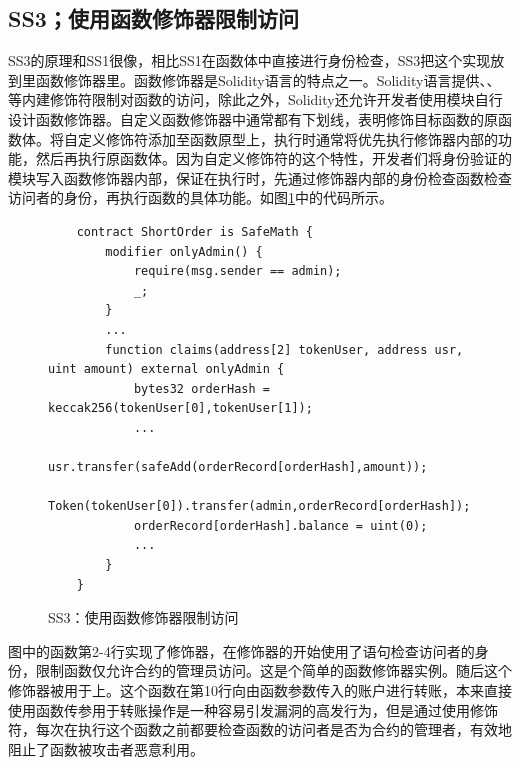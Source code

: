 \subsection{SS3；使用函数修饰器限制访问}
SS3的原理和SS1很像，相比SS1在函数体中直接进行身份检查，SS3把这个实现放到里函数修饰器里。函数修饰器是Solidity语言的特点之一。Solidity语言提供、、等内建修饰符限制对函数的访问，除此之外，Solidity还允许开发者使用模块自行设计函数修饰器。自定义函数修饰器中通常都有下划线\codeff{\_;}，表明修饰目标函数的原函数体。将自定义修饰符添加至函数原型上，执行时通常将优先执行修饰器内部的功能，然后再执行原函数体。因为自定义修饰符的这个特性，开发者们将身份验证的模块写入函数修饰器内部，保证在执行时，先通过修饰器内部的身份检查函数检查访问者的身份，再执行函数的具体功能。如图\ref{fig:ss3_example}中的代码所示。
\begin{figure}
\begin{minipage}[htbp]{1.0\linewidth}
    \begin{lstlisting}
    contract ShortOrder is SafeMath {
        modifier onlyAdmin() {
            require(msg.sender == admin);
            _;
        }
        ...
        function claims(address[2] tokenUser, address usr, uint amount) external onlyAdmin {
            bytes32 orderHash = keccak256(tokenUser[0],tokenUser[1]);
            ...
            usr.transfer(safeAdd(orderRecord[orderHash],amount));
            Token(tokenUser[0]).transfer(admin,orderRecord[orderHash]);
            orderRecord[orderHash].balance = uint(0);
            ...
        }
    }
\end{lstlisting}
\end{minipage}
\vspace{-5mm}
\caption{SS3：使用函数修饰器限制访问}
\label{fig:ss3_example}
\end{figure}
图中的函数第2-4行实现了修饰器，在修饰器的开始使用了语句检查访问者的身份，限制函数仅允许合约的管理员访问。这是个简单的函数修饰器实例。随后这个修饰器被用于上。这个函数在第10行向由函数参数传入的账户进行转账，本来直接使用函数传参用于转账操作是一种容易引发漏洞的高发行为，但是通过使用修饰符，每次在执行这个函数之前都要检查函数的访问者是否为合约的管理者，有效地阻止了函数被攻击者恶意利用。

